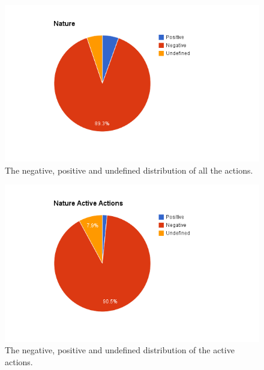 \begin{table}[!h]
	\begin{center}
	\caption{Analysis results from the content analysis for the nature of the action.}
	\label{table:nature-results}
	\end{center}
\end{table}

\begin{figure}[!h]
	\centering
	\includegraphics[width=\textwidth, keepaspectratio]{figures/nature-p.png}
	\caption{The negative, positive and undefined distribution of all the actions.}
	\label{figure:nature-p}
\end{figure}

\begin{figure}[!h]
	\centering
	\includegraphics[width=\textwidth, keepaspectratio]{figures/nature-pa.png}
	\caption{The negative, positive and undefined distribution of the active actions.}
	\label{figure:nature-pa}
\end{figure}

